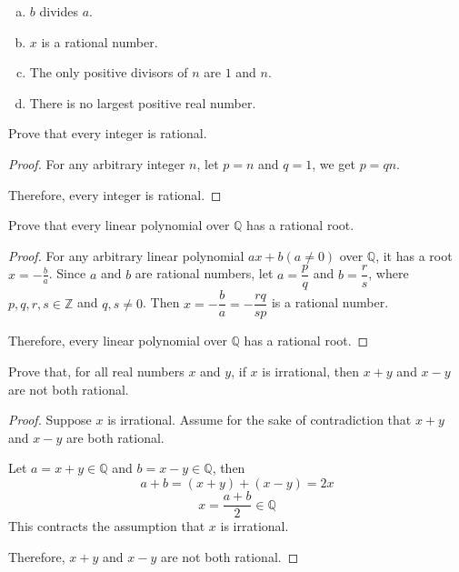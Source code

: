 \begin{solutions*}
    \fixlistskip
    \begin{enumerate}[(a)]
    \item $b$ divides $a$.
    \item $x$ is a rational number.
    \item The only positive divisors of $n$ are $1$ and $n$.
    \item There is no largest positive real number.
    \end{enumerate}
\end{solutions*}

\begin{exercise}
\label{exEveryIntegerIsRational}
Prove that every integer is rational.
\end{exercise}

\begin{solutions*}
    \fixlistskip
    \begin{proof}
        For any arbitrary integer $n$, let $p = n$ and $q = 1$, we get $p = qn$.

        Therefore, every integer is rational.
    \end{proof}
\end{solutions*}

\begin{exercise}
Prove that every linear polynomial over $\mathbb{Q}$ has a rational root.
\end{exercise}

\begin{solutions*}
    \fixlistskip
    \begin{proof}
        For any arbitrary linear polynomial $ax + b (a \neq 0)$ over $\mathbb{Q}$, it has a root $x = -\frac{b}{a}$. Since $a$ and $b$ are rational numbers, let $a = \dfrac{p}{q}$ and $b = \dfrac{r}{s}$, where $p, q, r, s \in \mathbb{Z}$ and $q, s \ne 0$. Then $x = -\dfrac{b}{a}=-\dfrac{rq}{sp}$ is a rational number.

        Therefore, every linear polynomial over $\mathbb{Q}$ has a rational root.
    \end{proof}
\end{solutions*}

\begin{exercise}
Prove that, for all real numbers $x$ and $y$, if $x$ is irrational, then $x+y$ and $x-y$ are not both rational.
\end{exercise}

\begin{solutions*}
    \fixlistskip
    \begin{proof}
    Suppose $x$ is irrational. Assume for the sake of contradiction that $x+y$ and $x-y$ are both rational.
    
    Let $a = x+y \in \mathbb{Q}$ and $b = x-y \in \mathbb{Q}$, then
    \[a+b = (x+y) + (x-y) = 2x\]
    \[x = \frac{a+b}{2} \in \mathbb{Q}\]
    This contracts the assumption that $x$ is irrational. 
    
    Therefore, $x+y$ and $x-y$ are not both rational.
    \end{proof}
\end{solutions*}

